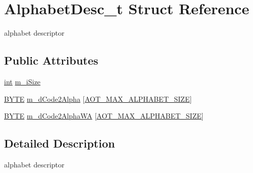 \hypertarget{structAlphabetDesc__t}{\section{Alphabet\-Desc\-\_\-t Struct Reference}
\label{structAlphabetDesc__t}
}


alphabet descriptor  


\subsection*{Public Attributes}
\begin{DoxyCompactItemize}
\item 
\hyperlink{sphinxexpr_8cpp_a4a26e8f9cb8b736e0c4cbf4d16de985e}{int} \hyperlink{structAlphabetDesc__t_aebcaf8e69dd11f37ce0d25f1ab016bfd}{m\-\_\-i\-Size}
\item 
\hyperlink{sphinxstd_8h_a4ae1dab0fb4b072a66584546209e7d58}{B\-Y\-T\-E} \hyperlink{structAlphabetDesc__t_acbfafafd817f53555b06ed844d6b94ab}{m\-\_\-d\-Code2\-Alpha} \mbox{[}\hyperlink{sphinxaot_8cpp_a87f523db93d66f0e415a7080e742e5fc}{A\-O\-T\-\_\-\-M\-A\-X\-\_\-\-A\-L\-P\-H\-A\-B\-E\-T\-\_\-\-S\-I\-Z\-E}\mbox{]}
\item 
\hyperlink{sphinxstd_8h_a4ae1dab0fb4b072a66584546209e7d58}{B\-Y\-T\-E} \hyperlink{structAlphabetDesc__t_a9d817cc77461eec22c7d89ae14a7002b}{m\-\_\-d\-Code2\-Alpha\-W\-A} \mbox{[}\hyperlink{sphinxaot_8cpp_a87f523db93d66f0e415a7080e742e5fc}{A\-O\-T\-\_\-\-M\-A\-X\-\_\-\-A\-L\-P\-H\-A\-B\-E\-T\-\_\-\-S\-I\-Z\-E}\mbox{]}
\end{DoxyCompactItemize}


\subsection{Detailed Description}
alphabet descriptor 

